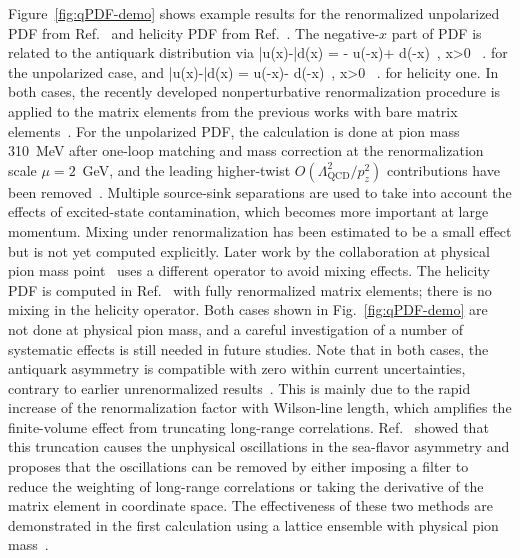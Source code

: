 Figure~\ref{fig:qPDF-demo} shows example results for the renormalized unpolarized PDF from Ref.~\cite{Chen:2017mzz} and helicity PDF from Ref.~\cite{Alexandrou:2017huk}.
The negative-$x$ part of PDF is related to the antiquark distribution via
\be
\bar{u}(x)-\bar{d}(x) = - u(-x)+ d(-x)\, , \qquad {} \quad x>0 \, .
\ee
for the unpolarized case, and
\be
\Delta\bar{u}(x)-\Delta\bar{d}(x) =  \Delta u(-x)- \Delta d(-x)\, , \qquad {} \quad x>0 \, .
\ee
for helicity one. 
In both cases, the recently developed nonperturbative renormalization procedure is applied to the matrix elements from the previous works with bare matrix elements~\cite{Lin:2014zya,Alexandrou:2015rja,Chen:2016utp,Alexandrou:2016eyt}.
%
For the unpolarized PDF, the calculation is done at pion mass 310~MeV after one-loop matching and mass correction at the renormalization scale $\mu=2$~GeV, and the leading higher-twist $O(\Lambda_\text{QCD}^2/p_z^2)$ contributions have been removed~\cite{Chen:2016utp}. Multiple source-sink separations are used to take into account the effects of excited-state contamination, which becomes more important at large momentum. Mixing under renormalization has been estimated to be a small effect but is not yet computed explicitly. Later work by the collaboration at physical pion mass point~\cite{Lin:2017ani} uses a different operator to avoid mixing effects. 
%
The helicity PDF is computed in Ref.~\cite{Alexandrou:2017huk} with fully renormalized matrix elements; there is no mixing in the helicity operator. 
%
Both cases shown in Fig.~\ref{fig:qPDF-demo} are not done at physical pion mass, and a careful investigation of a number of systematic effects is still needed in future studies.
% 
Note that in both cases, the antiquark asymmetry is compatible with zero within current uncertainties, contrary to earlier unrenormalized results~\cite{Lin:2014zya,Alexandrou:2015rja,Chen:2016utp,Alexandrou:2016eyt}.
This is mainly due to the rapid increase
of the renormalization factor with Wilson-line length, which amplifies the finite-volume effect from truncating long-range correlations. Ref.~\cite{Lin:2017ani} showed that this truncation causes the unphysical oscillations in the sea-flavor asymmetry and proposes that the oscillations can be removed by either imposing a filter to reduce the weighting of long-range correlations or taking the derivative of the matrix element in coordinate space. The effectiveness of these two methods are demonstrated in the first calculation using a lattice ensemble with physical pion mass~\cite{Lin:2017ani}. 

